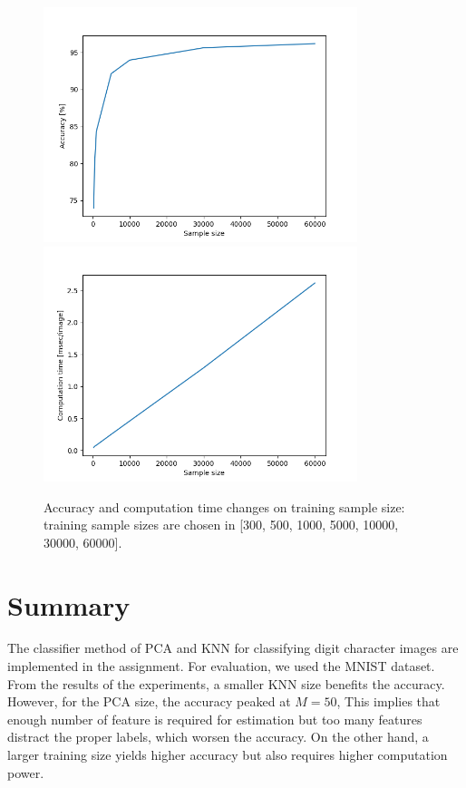 \documentclass[conference]{IEEEtran}
\begin{document}
\begin{figure}[!t]
	\centering
	\includegraphics[width=3.6in]{sample_test.png}	
	\includegraphics[width=3.6in]{sample_time.png}	
	\caption{Accuracy and computation time changes on training sample size: training sample sizes are chosen in [300, 500, 1000, 5000, 10000, 30000, 60000].}
	\label{fig:sample_test}
\end{figure}


\section{Summary} %
The classifier method of PCA and KNN for classifying digit character images are implemented in the assignment. For evaluation, we used the MNIST dataset. From the results of the experiments, a smaller KNN size benefits the accuracy. However, for the PCA size, the accuracy peaked at $M=50$, This implies that enough number of feature is required for estimation but too many features distract the proper labels, which worsen the accuracy. On the other hand, a larger training size yields higher accuracy but also requires higher computation power.







\end{document}
